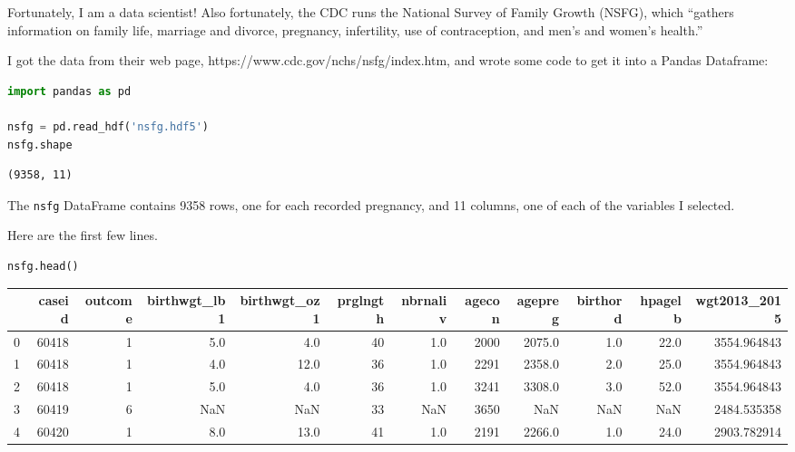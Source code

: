 Fortunately, I am a data scientist! Also fortunately, the CDC runs the
National Survey of Family Growth (NSFG), which ``gathers information on
family life, marriage and divorce, pregnancy, infertility, use of
contraception, and men's and women's health.''

I got the data from their web page,
https://www.cdc.gov/nchs/nsfg/index.htm, and wrote some code to get it
into a Pandas Dataframe:

\begin{lstlisting}[language=Python,style=source]
import pandas as pd

nsfg = pd.read_hdf('nsfg.hdf5')
nsfg.shape
\end{lstlisting}

\begin{lstlisting}[style=output]
(9358, 11)
\end{lstlisting}

The \passthrough{\lstinline!nsfg!} DataFrame contains 9358 rows, one for
each recorded pregnancy, and 11 columns, one of each of the variables I
selected.

Here are the first few lines.

\begin{lstlisting}[language=Python,style=source]
nsfg.head()
\end{lstlisting}

\begin{tabular}{lrrrrrrrrrrr}
\toprule
{} &  caseid &  outcome &  birthwgt\_lb1 &  birthwgt\_oz1 &  prglngth &  nbrnaliv &  agecon &  agepreg &  birthord &  hpagelb &  wgt2013\_2015 \\
\midrule
0 &   60418 &        1 &           5.0 &           4.0 &        40 &       1.0 &    2000 &   2075.0 &       1.0 &     22.0 &   3554.964843 \\
1 &   60418 &        1 &           4.0 &          12.0 &        36 &       1.0 &    2291 &   2358.0 &       2.0 &     25.0 &   3554.964843 \\
2 &   60418 &        1 &           5.0 &           4.0 &        36 &       1.0 &    3241 &   3308.0 &       3.0 &     52.0 &   3554.964843 \\
3 &   60419 &        6 &           NaN &           NaN &        33 &       NaN &    3650 &      NaN &       NaN &      NaN &   2484.535358 \\
4 &   60420 &        1 &           8.0 &          13.0 &        41 &       1.0 &    2191 &   2266.0 &       1.0 &     24.0 &   2903.782914 \\
\bottomrule
\end{tabular}

